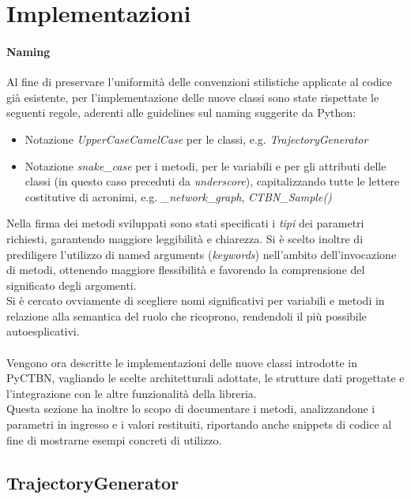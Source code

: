   \newpage
  \section{Implementazioni}
  \paragraph{Naming}
  Al fine di preservare l'uniformità delle convenzioni stilistiche applicate al codice
  già esistente, per l'implementazione delle nuove classi sono state rispettate le seguenti regole,
  aderenti alle guidelines sul naming suggerite da Python:
  \begin{itemize}
    \item Notazione \textit{UpperCaseCamelCase} per le classi, e.g. \textit{TrajectoryGenerator}
    \item Notazione \textit{snake\_case} per i metodi, per le variabili e per gli attributi delle classi 
      (in questo caso preceduti da \textit{underscore}), capitalizzando tutte le lettere 
      costitutive di acronimi, e.g. \textit{\_network\_graph}, \textit{CTBN\_Sample()}
  \end{itemize}
  Nella firma dei metodi sviluppati sono stati specificati i \textit{tipi} dei parametri richiesti,
  garantendo maggiore leggibilità e chiarezza. Si è scelto inoltre di prediligere
  l'utilizzo di named arguments (\textit{keywords}) nell'ambito dell'invocazione
  di metodi, ottenendo maggiore flessibilità e favorendo la comprensione del significato
  degli argomenti.\\
  Si è cercato ovviamente di scegliere nomi significativi per variabili e metodi
  in relazione alla semantica del ruolo che ricoprono, rendendoli il più possibile
  autoesplicativi. 

  \paragraph{}
  Vengono ora descritte le implementazioni delle nuove classi introdotte in PyCTBN,
  vagliando le scelte architetturali adottate, le strutture dati progettate e
  l'integrazione con le altre funzionalità della libreria.\\
  Questa sezione ha inoltre lo scopo di documentare i metodi, analizzandone i parametri
  in ingresso e i valori restituiti, riportando anche snippets di codice al fine di mostrarne
  esempi concreti di utilizzo.  
  
  \subsection{TrajectoryGenerator}

